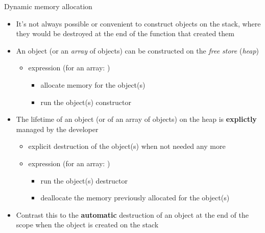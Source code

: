 \begin{frame}{Dynamic memory allocation}

  \begin{itemize}
  \item<1-> It's not always possible or convenient to construct objects on the
    stack, where they would be destroyed at the end of the function that created
    them
  \item<2-> An object (or an \textit{array} of objects) can be constructed on
    the \textit{free store} (\textit{heap})
    \begin{itemize}
    \item {} expression (for an array: )
      \begin{itemize}
      \item allocate memory for the object(s)
      \item run the object(s) constructor
      \end{itemize}
    \end{itemize}
  \item<3-> The lifetime of an object (or of an array of objects) on the heap is
    \textbf{explictly} managed by the developer
    \begin{itemize}
    \item explicit destruction of the object(s) when not needed any more
    \item {} expression (for an array: )
      \begin{itemize}
      \item run the object(s) destructor
      \item deallocate the memory previously allocated for the object(s)
      \end{itemize}
    \end{itemize}
  \item<4-> Contrast this to the \textbf{automatic} destruction of an object at
    the end of the scope when the object is created on the stack
  \end{itemize}

\end{frame}

